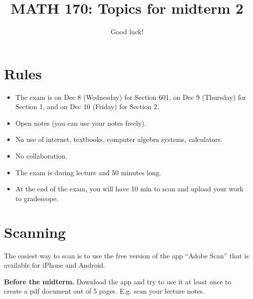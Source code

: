 \documentclass[12pt]{amsart}
\title{ MATH 170: Topics for midterm 2 }
\author{Good luck!}
\date{}
\begin{document}
\maketitle


\section*{Rules}

\begin{itemize}
    \item The exam is on Dec 8 (Wednesday) for Section 601, on Dec 9 (Thursday) for Section 1, and on Dec 10 (Friday) for Section 2.
    \item Open notes (you can use your notes freely).
    \item No use of internet, textbooks, computer algebra systems, calculators. 
    \item No collaboration.
    \item The exam is during lecture and 50 minutes long.
    \item At the end of the exam, you will have 10 min to scan and upload your work to gradescope.
\end{itemize}


\section*{Scanning}

The easiest way to scan is to use the free version of the app ``Adobe Scan'' that is available for iPhone and Android.

\textbf{Before the midterm.} Download the app and try to use it at least once to create a pdf document out of 5 pages. E.g. scan your lecture notes.
\end{document}
